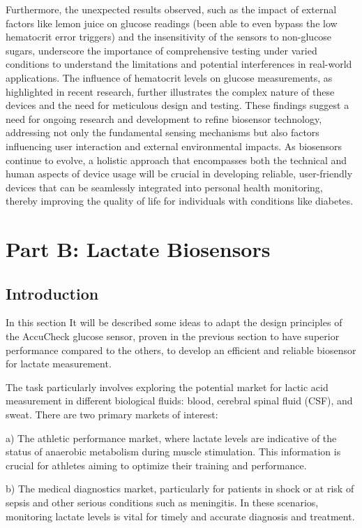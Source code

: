 \documentclass[conference]{IEEEtran}
\begin{document}
 Furthermore, the unexpected results observed, such as the impact of external 
 factors like lemon juice on glucose readings (been able to even bypass the low hematocrit error triggers)
  and the insensitivity of the 
 sensors to non-glucose sugars, underscore the importance of comprehensive 
 testing under varied conditions to understand the limitations and potential 
 interferences in real-world applications. The influence of hematocrit levels on 
 glucose measurements, as highlighted in recent research, further illustrates 
 the complex nature of these devices and the need for meticulous design and 
 testing. These findings suggest a need for ongoing research and development to 
 refine biosensor technology, addressing not only the fundamental sensing 
 mechanisms but also factors influencing user interaction and external 
 environmental impacts. As biosensors continue to evolve, a holistic approach 
 that encompasses both the technical and human aspects of device usage will be 
 crucial in developing reliable, user-friendly devices that can be seamlessly 
 integrated into personal health monitoring, thereby improving the quality of 
 life for individuals with conditions like diabetes.
 
\section{Part B: Lactate Biosensors}

\subsection{Introduction}

In this section It will be described some ideas to adapt the design principles of 
the AccuCheck glucose sensor, proven in the previous section to have 
superior performance compared to the others, to develop an efficient 
and reliable biosensor for lactate measurement.

The task particularly involves exploring the potential market for lactic acid 
measurement in different biological fluids: blood, cerebral spinal fluid 
(CSF), and sweat. There are two primary markets of interest:

a) The athletic performance market, where lactate levels are indicative of 
the status of anaerobic metabolism during muscle stimulation. This 
information is crucial for athletes aiming to optimize their training and 
performance.

b) The medical diagnostics market, particularly for patients in shock or at 
risk of sepsis and other serious conditions such as meningitis. In these 
scenarios, monitoring lactate levels is vital for timely and accurate 
diagnosis and treatment.
\end{document}
